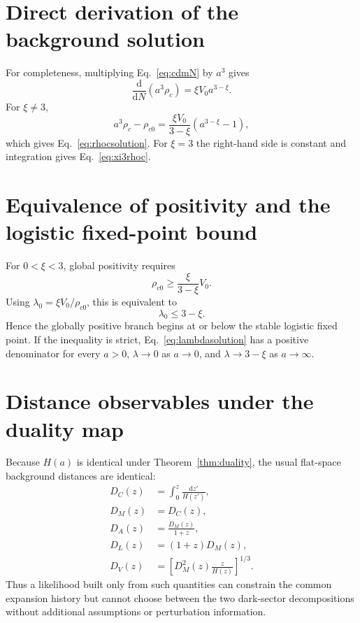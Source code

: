 \documentclass[11pt]{article}
\theoremstyle{remark}
\newcommand{\dd}{\mathrm d}
\begin{document}
\appendix

\section{Direct derivation of the background solution}

For completeness, multiplying Eq.~\eqref{eq:cdmN} by $a^3$ gives
\begin{equation}
    \frac{\dd}{\dd N}(a^3\rho_c)=\xi V_0 a^{3-\xi}.
\end{equation}
For $\xi\neq3$,
\begin{equation}
    a^3\rho_c-\rho_{c0}
    =\frac{\xi V_0}{3-\xi}\left(a^{3-\xi}-1\right),
\end{equation}
which gives Eq.~\eqref{eq:rhocsolution}.  For $\xi=3$ the right-hand side is constant and integration gives Eq.~\eqref{eq:xi3rhoc}.

\section{Equivalence of positivity and the logistic fixed-point bound}

For $0<\xi<3$, global positivity requires
\begin{equation}
    \rho_{c0}\ge\frac{\xi}{3-\xi}V_0.
\end{equation}
Using $\lambda_0=\xi V_0/\rho_{c0}$, this is equivalent to
\begin{equation}
    \lambda_0\le3-\xi.
\end{equation}
Hence the globally positive branch begins at or below the stable logistic fixed point.  If the inequality is strict, Eq.~\eqref{eq:lambdasolution} has a positive denominator for every $a>0$, $\lambda\to0$ as $a\to0$, and $\lambda\to3-\xi$ as $a\to\infty$.

\section{Distance observables under the duality map}

Because $H(a)$ is identical under Theorem~\ref{thm:duality}, the usual flat-space background distances are identical:
\begin{align}
    D_C(z)&=\int_0^z\frac{\dd z'}{H(z')},\\
    D_M(z)&=D_C(z),\\
    D_A(z)&=\frac{D_M(z)}{1+z},\\
    D_L(z)&=(1+z)D_M(z),\\
    D_V(z)&=\left[D_M^2(z)\frac{z}{H(z)}\right]^{1/3}.
\end{align}
Thus a likelihood built only from such quantities can constrain the common expansion history but cannot choose between the two dark-sector decompositions without additional assumptions or perturbation information.
\end{document}
